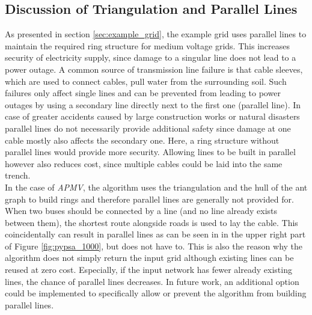 \subsection{Discussion of Triangulation and Parallel Lines}\label{sec:discussion}
As presented in section \ref{sec:example_grid}, the example grid uses parallel lines to maintain the required ring structure for medium voltage grids. This increases security of electricity supply, since damage to a singular line does not lead to a power outage. A common source of transmission line failure is that cable sleeves, which are used to connect cables, pull water from the surrounding soil. Such failures only affect single lines and can be prevented from leading to power outages by using a secondary line directly next to the first one (parallel line). In case of greater accidents caused by large construction works or natural disasters parallel lines do not necessarily provide additional safety since damage at one cable mostly also affects the secondary one. Here, a ring structure without parallel lines would provide more security. Allowing lines to be built in parallel however also reduces cost, since multiple cables could be laid into the same trench. \\
In the case of \textit{APMV}, the algorithm uses the triangulation and the hull of the ant graph to build rings and therefore parallel lines are generally not provided for. When two buses should be connected by a line (and no line already exists between them), the shortest route alongside roads is used to lay the cable. This coincidentally can result in parallel lines as can be seen in in the upper right part of Figure \ref{fig:pypsa_1000}, but does not have to. This is also the reason why the algorithm does not simply return the input grid although existing lines can be reused at zero cost. Especially, if the input network has fewer already existing lines, the chance of parallel lines decreases. In future work, an additional option could be implemented to specifically allow or prevent the algorithm from building parallel lines.
	
	
	
	
	
	
	
	
	
	
	
	
	
	